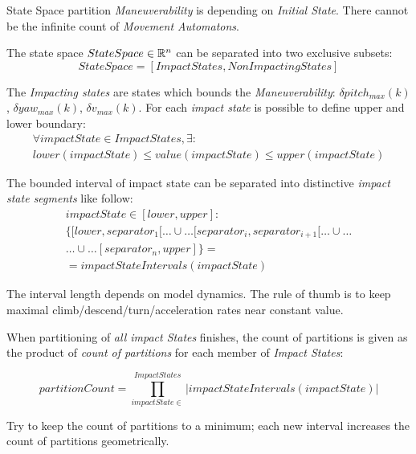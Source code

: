 \begin{definition}{State Space partition}\label{def:stateSpacePartition}
    \emph{Maneuverability} is depending on \emph{Initial State}. There cannot be the infinite count of \emph{Movement Automatons}.
    
    The state space $State Space \in \mathbb{R}^n$ can be separated into two exclusive subsets:
    \begin{equation}
        StateSpace = [ImpactStates, NonImpactingStates]
    \end{equation}
    
    The \emph{Impacting states} are states which bounds the \emph{Maneuverability}: $\delta pitch_{max}(k)$, $\delta yaw_{max}(k)$, $\delta v_{max}(k)$. For each \emph{impact state} is possible to define upper and lower boundary:
    \begin{multline}
        \forall impactState\in ImpactStates, \exists:\\ lower(impactState) \le value(impactState) \le upper(impactState) 
    \end{multline}
    
	\noindent    The bounded interval of impact state can be separated into distinctive \emph{impact state segments} like follow:
    \begin{multline}
        impactState\in [lower,upper]:\\ \{[lower,separator_1[\dots\cup\dots[separator_i,separator_{i+1}[\dots\cup\dots\\\dots\cup\dots[separator_n,upper]\}=\\
        = impactStateIntervals(impactState)
    \end{multline}
    \begin{note}
        The interval length depends on model dynamics. The rule of thumb is to keep maximal climb/descend/turn/acceleration rates near constant value. 
    \end{note}
      
\noindent When partitioning of \emph{all impact States} finishes, the count of partitions is given as the product of \emph{count of partitions} for each member of \emph{Impact States}:
    
    \begin{equation}
        partition Count = \prod_{impactState \in}^{ImpactStates} |impactStateIntervals(impactState)| 
    \end{equation}
    
    \begin{note}
        Try to keep the count of partitions to a minimum; each new interval increases the count of partitions geometrically. 
    \end{note}
    

\end{definition}

